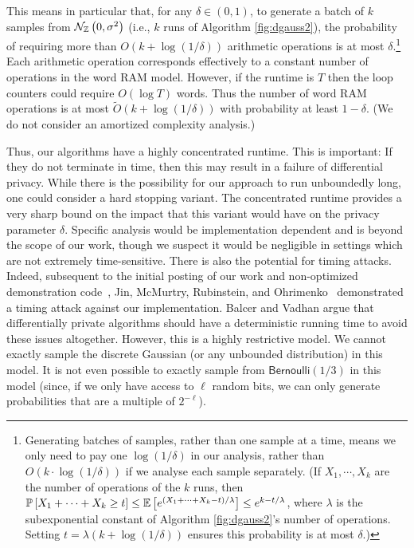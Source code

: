 \documentclass{jpc}
\newcommand{\dgausss}[2]{{\discN\left(#1,#2\right)}}
\newcommand{\dgauss}[1]{\dgausss{0}{#1}}
\newcommand{\ex}[2]{{\ifx&#1& \mathbb{E} \else
\underset{#1}{\mathbb{E}} \fi \left[#2\right]}}
\newcommand{\pr}[2]{{\ifx&#1& \mathbb{P} \else
\underset{#1}{\mathbb{P}} \fi \left[#2\right]}}
\newcommand{\bern}{\mathsf{Bernoulli}}
\begin{document}
This means in particular that, for any $\delta \in (0,1)$, to generate a batch of $k$ samples from $\dgauss{\sigma^2}$ (i.e., $k$ runs of Algorithm \ref{fig:dgauss2}), the probability of requiring more than $O(k + \log(1/\delta))$ arithmetic operations is at most $\delta$.\footnote{Generating batches of samples, rather than one sample at a time, means we only need to pay one $\log(1/\delta)$ in our analysis, rather than $O(k \cdot \log(1/\delta))$ if we analyse each sample separately. (If $X_1,\cdots,X_k$ are the number of operations of the $k$ runs, then $\pr{}{X_1 + \cdots + X_k \ge t} \le \ex{}{e^{(X_1 + \cdots + X_k-t)/\lambda}} \le e^{k-t/\lambda}$, where $\lambda$ is the subexponential constant of Algorithm \ref{fig:dgauss2}'s number of operations. Setting $t=\lambda(k+\log(1/\delta))$ ensures this probability is at most $\delta$.)} Each arithmetic operation corresponds effectively to a constant number of operations in the word RAM model. However, if the runtime is $T$ then the loop counters could require $O(\log T)$ words. Thus the number of word RAM operations is at most $\tilde{O}(k + \log(1/\delta))$ with probability at least $1-\delta$. (We do not consider an amortized complexity analysis.)

Thus, our algorithms have a highly concentrated runtime. This is important: If they do not terminate in time, then this may result in a failure of differential privacy. 
While there is the possibility for our approach to run unboundedly long, one could consider a hard stopping variant.
The concentrated runtime provides a very sharp bound on the impact that this variant would have on the privacy parameter $\delta$.
Specific analysis would be implementation dependent and is beyond the scope of our work, though we suspect it would be negligible in settings which are not extremely time-sensitive.
There is also the potential for timing attacks.
Indeed, subsequent to the initial posting of our work and non-optimized demonstration code~\cite{CKS20,DGaussGithub}, Jin, McMurtry, Rubinstein, and Ohrimenko~\cite{JinMRO21} demonstrated a timing attack against our implementation. 
Balcer and Vadhan \cite{BalcerV17} argue that differentially private algorithms should have a deterministic running time to avoid these issues altogether. However, this is a highly restrictive model. We cannot exactly sample the discrete Gaussian (or any unbounded distribution) in this model. It is not even possible to exactly sample from $\bern(1/3)$ in this model (since, if we only have access to $\ell$ random bits, we can only generate probabilities that are a multiple of $2^{-\ell}$). 
\end{document}
